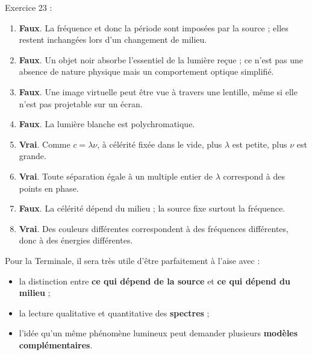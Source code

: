 \documentclass[11pt,a4paper]{article}
\newcommand{\vrai}{\textbf{Vrai}}
\newcommand{\faux}{\textbf{Faux}}
\begin{document}
\begin{corrbox}
Exercice 23 :
\begin{enumerate}[label=\arabic*.,leftmargin=0.8cm]
    \item \faux. La fréquence et donc la période sont imposées par la source ; elles restent inchangées lors d'un changement de milieu.
    \item \faux. Un objet noir absorbe l'essentiel de la lumière reçue ; ce n'est pas une absence de nature physique mais un comportement optique simplifié.
    \item \faux. Une image virtuelle peut être vue à travers une lentille, même si elle n'est pas projetable sur un écran.
    \item \faux. La lumière blanche est polychromatique.
    \item \vrai. Comme $c=\lambda\nu$, à célérité fixée dans le vide, plus $\lambda$ est petite, plus $\nu$ est grande.
    \item \vrai. Toute séparation égale à un multiple entier de $\lambda$ correspond à des points en phase.
    \item \faux. La célérité dépend du milieu ; la source fixe surtout la fréquence.
    \item \vrai. Des couleurs différentes correspondent à des fréquences différentes, donc à des énergies différentes.
\end{enumerate}
\end{corrbox}

\begin{ouverturebox}
Pour la Terminale, il sera très utile d'être parfaitement à l'aise avec :
\begin{itemize}[leftmargin=1.2em]
    \item la distinction entre \textbf{ce qui dépend de la source} et \textbf{ce qui dépend du milieu} ;
    \item la lecture qualitative et quantitative des \textbf{spectres} ;
    \item l'idée qu'un même phénomène lumineux peut demander plusieurs \textbf{modèles complémentaires}.
\end{itemize}
\end{ouverturebox}
\end{document}
